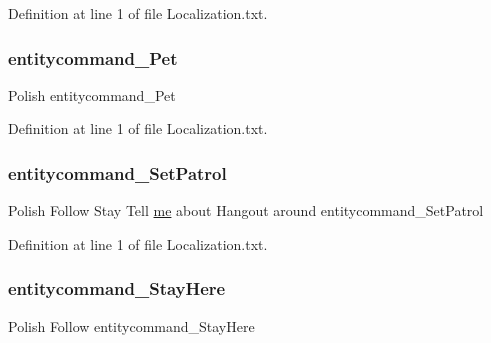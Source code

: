 Definition at line 1 of file Localization.\+txt.

\mbox{\label{_blooms_01_animal_01_husbandry_2_config_2_localization_8txt_a60467b0275f4d137dd8af94959a5758a}} 
\subsubsection{\texorpdfstring{entitycommand\_Pet}{entitycommand\_Pet}}
{\footnotesize\ttfamily Polish entitycommand\+\_\+\+Pet}



Definition at line 1 of file Localization.\+txt.

\mbox{\label{_blooms_01_animal_01_husbandry_2_config_2_localization_8txt_a2edb8eefc1c577dbd1b58ed8023807eb}} 
\subsubsection{\texorpdfstring{entitycommand\_SetPatrol}{entitycommand\_SetPatrol}}
{\footnotesize\ttfamily Polish Follow Stay Tell \mbox{\hyperlink{_blooms_01_animal_01_husbandry_2_config_2_localization_8txt_a290fbecf7c016b09bc675718400d6fca}{me}} about Hangout around entitycommand\+\_\+\+Set\+Patrol}



Definition at line 1 of file Localization.\+txt.

\mbox{\label{_blooms_01_animal_01_husbandry_2_config_2_localization_8txt_a4102eec5fe4db37b6c63db1c518dd5e0}} 
\subsubsection{\texorpdfstring{entitycommand\_StayHere}{entitycommand\_StayHere}}
{\footnotesize\ttfamily Polish Follow entitycommand\+\_\+\+Stay\+Here}



